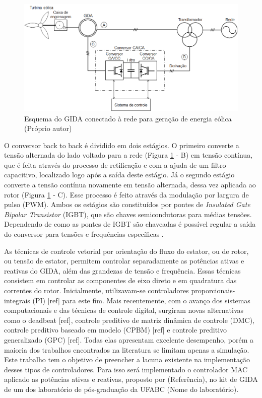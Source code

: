 	
	\begin{figure}[h]
		\centering
		\label{figura:gida_esquematico}
		\includegraphics[width=1\textwidth]{Figuras/gida_esquematico.png}
		\caption{Esquema do GIDA conectado à  rede para geração de energia eólica (Próprio autor)}
	\end{figure}

	O conversor back to back é dividido em dois estágios. O primeiro converte a tensão alternada do lado voltado para a rede (Figura \ref{figura:gida_esquematico} - B) em tensão contínua, que é feita através do processo de retificação e com a ajuda de um filtro capacitivo, localizado logo após a saída deste estágio. Já o segundo estágio converte a tensão contínua novamente em tensão alternada, dessa vez aplicada ao rotor (Figura \ref{figura:gida_esquematico} - C). Esse processo é feito através da modulação por largura de pulso (PWM). Ambos os estágios são constituídos por pontes de \emph{Insulated Gate Bipolar Transistor} (IGBT), que são chaves semicondutoras para médias tensões. Dependendo de como as pontes de IGBT são chaveadas é possível regular a saída do conversor para tensões e frequências específicas \cite{alfeu}. 
	
	As técnicas de controle vetorial por orientação do fluxo do estator, ou de rotor, ou tensão de estator, permitem controlar separadamente as potências ativas e reativas do GIDA, além das grandezas de tensão e frequência. Essas técnicas consistem em controlar as componentes de eixo direto e em quadratura das correntes do rotor. Inicialmente, utilizavam-se controladores proporcionais-integrais (PI) [ref] para este fim. Mais recentemente, com o avanço dos sistemas computacionais e das técnicas de controle digital, surgiram novas alternativas como o deadbeat [ref], controle preditivo de matriz dinâmica de controle (DMC), controle preditivo baseado em modelo (CPBM) [ref] e controle preditivo generalizado (GPC) [ref]. Todas elas apresentam excelente desempenho, porém a maioria dos trabalhos encontrados na literatura se limitam apenas a simulação. Este trabalho tem o objetivo de preencher a lacuna existente na implementação desses tipos de controladores. Para isso será implementado o controlador MAC aplicado as potências ativas e reativas, proposto por (Referência), no kit de GIDA de um dos laboratório de pós-graduação da UFABC (Nome do laboratório).

	
	
	
